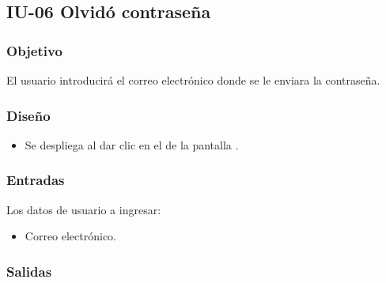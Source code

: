 \newpage
\subsection{IU-06 Olvidó contraseña}

\subsubsection{Objetivo}
	El usuario introducirá el correo electrónico donde se le enviara la contraseña.
\subsubsection{Diseño}
	\begin{itemize}
		\item Se despliega al dar clic en el  de la pantalla .
\end{itemize}		


\subsubsection{Entradas}
Los datos de usuario a ingresar:
\begin{itemize}
	\item Correo electrónico.
\end{itemize}

\subsubsection{Salidas}
\begin{Citemize}
	\item {}
	\item {}
	\item {}
\end{Citemize}
